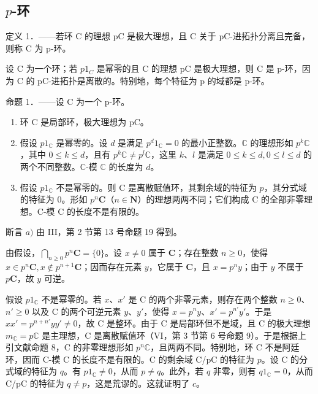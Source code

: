 \subsection{\texorpdfstring{\(p\)-环}{p-环}}

定义 1．——若环 C 的理想 pC 是极大理想，且 C 关于 pC-进拓扑分离且完备，则称 C 为 p-环。

设 C 为一个环；若 \(p1_{C}\) 是幂零的且 C 的理想 pC 是极大理想，则 C 是 p-环，因为 C 的 pC-进拓扑是离散的。特别地，每个特征为 p 的域都是 p-环。

命题 1．——设 C 为一个 p-环。

\begin{enumerate}
\def\labelenumi{\alph{enumi})}
\item
  环 C 是局部环，极大理想为 pC。
\item
  假设 \(p1_{\mathbb{C}}\) 是幂零的。设 \(d\) 是满足 \(p^{d}1_{\mathbb{C}} = 0\) 的最小正整数。\(\mathbb{C}\) 的理想形如 \(p^{k}\mathbb{C}\)，其中 \(0 \leqslant k \leqslant d\)，且有 \(p^{k}\mathbb{C} \neq p^{l}\mathbb{C}\)，这里 \(k\)、\(l\) 是满足 \(0 \leqslant k \leqslant d, 0 \leqslant l \leqslant d\) 的两个不同整数。\(\mathbb{C}\)-模 \(\mathbb{C}\) 的长度为 \(d\)。
\item
  假设 \(p1_{\mathbb{C}}\) 不是幂零的。则 C 是离散赋值环，其剩余域的特征为 \(p\)，其分式域的特征为 0。形如 \(p^{n}\mathbf{C}\)（\(n \in \mathbf{N}\)）的理想两两不同；它们构成 C 的全部非零理想。C-模 C 的长度不是有限的。
\end{enumerate}

断言 \(a)\) 由 III，第 2 节第 13 号命题 19 得到。

由假设，\(\bigcap_{n\geqslant 0}p^{n}\mathbf{C} = \{0\}\)。设 \(x\neq 0\) 属于 \(\mathbf{C}\)；存在整数 \(n\geqslant 0\)，使得 \(x\in p^n\mathbf{C}, x\notin p^{n + 1}\mathbf{C}\)；因而存在元素 \(y\)，它属于 \(\mathbf{C}\)，且 \(x = p^n y\)；由于 \(y\) 不属于 \(p\mathbf{C}\)，故 \(y\) 可逆。

假设 \(p1_{\mathbb{C}}\) 不是幂零的。若 \(x\)、\(x'\) 是 C 的两个非零元素，则存在两个整数 \(n \geqslant 0\)、\(n' \geqslant 0\) 以及 C 的两个可逆元素 \(y\)、\(y'\)，使得 \(x = p^n y\)、\(x' = p^{n'} y'\)。于是 \(xx' = p^{n+n'} yy' \neq 0\)，故 C 是整环。由于 C 是局部环但不是域，且 C 的极大理想 \(m_{\mathbb{C}} = p\mathbb{C}\) 是主理想，C 是离散赋值环（VI，第 3 节第 6 号命题 9）。于是根据上引文献命题 8，C 的非零理想形如 \(p^n\mathbb{C}\)，且两两不同。特别地，环 C 不是阿廷环，因而 C-模 C 的长度不是有限的。C 的剩余域 C/pC 的特征为 \(p\)。设 C 的分式域的特征为 \(q\)。有 \(p1_{\mathbb{C}} \neq 0\)，从而 \(p \neq q\)。此外，若 \(q\) 非零，则有 \(q1_{\mathbb{C}} = 0\)，从而 C/pC 的特征为 \(q \neq p\)，这是荒谬的。这就证明了 \(c\)。

